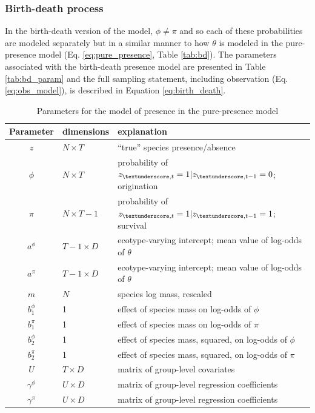 \documentclass[12pt,letterpaper]{article}
\begin{document}
\subsubsection*{Birth-death process}
In the birth-death version of the model, \(\phi \neq \pi\) and so each of these probabilities are modeled separately but in a similar manner to how \(\theta\) is modeled in the pure-presence model (Eq. \ref{eq:pure_presence}, Table \ref{tab:bd}). The parameters associated with the birth-death presence model are presented in Table \ref{tab:bd_param} and the full sampling statement, including observation (Eq. \ref{eq:obs_model}), is described in Equation \ref{eq:birth_death}. 

\begin{table}
  \centering
  \caption{Parameters for the model of presence in the pure-presence model}
  \begin{tabular}{c l l}
    Parameter & dimensions & explanation \\
    \hline
    \(z\) & \(N \times T\) & ``true'' species presence/absence \\
    \(\phi\) & \(N \times T\) & probability of \(z_{\textunderscore, t} = 1 | z_{\textunderscore, t - 1} = 0 \); origination \\
    \(\pi\) & \(N \times T - 1\) & probability of \(z_{\textunderscore, t} = 1 | z_{\textunderscore, t - 1} = 1 \); survival \\
    \(a^{\phi}\) & \(T - 1 \times D\) & ecotype-varying intercept; mean value of log-odds of \(\theta\) \\
    \(a^{\pi}\) & \(T - 1 \times D\) & ecotype-varying intercept; mean value of log-odds of \(\theta\) \\
    \(m\) & \(N\) & species log mass, rescaled \\
    \(b^{\phi}_{1}\) & 1 & effect of species mass on log-odds of \(\phi\) \\
    \(b^{\pi}_{1}\) & 1 & effect of species mass on log-odds of \(\pi\) \\
    \(b^{\phi}_{2}\) & 1 & effect of species mass, squared, on log-odds of \(\phi\) \\
    \(b^{\pi}_{2}\) & 1 & effect of species mass, squared, on log-odds of \(\pi\) \\
    \(U\) & \(T \times D\) & matrix of group-level covariates \\
    \(\gamma^{\phi}\) & \(U \times D\) & matrix of group-level regression coefficients \\
    \(\gamma^{\pi}\) & \(U \times D\) & matrix of group-level regression coefficients \\

\end{tabular}
\end{table}
\end{document}
